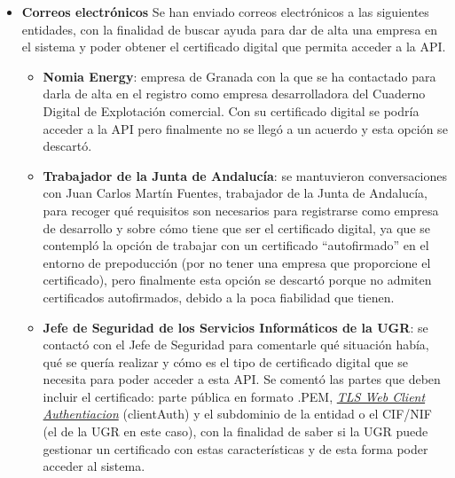\begin{itemize}
\begin{itemize}
        Las soluciones buscadas han conllevado el envío de correos electrónicos a entidades que puedan suplir este problema
        y hacer de ``empresa de desarrollo''. Los correos enviados se van a comentar a continuación.
    \end{itemize}

    \item \textbf{Correos electrónicos}
    \newline
    Se han enviado correos electrónicos a las siguientes entidades, con la finalidad de buscar ayuda para dar de alta
    una empresa en el sistema y poder obtener el certificado digital que permita acceder a la API.

    \begin{itemize}
        \item \textbf{Nomia Energy}: empresa de Granada con la que se ha contactado para darla de alta en el registro
        como empresa desarrolladora del Cuaderno Digital de Explotación comercial. Con su certificado digital se podría
        acceder a la API pero finalmente no se llegó a un acuerdo y esta opción se descartó.

        \item \textbf{Trabajador de la Junta de Andalucía}: se mantuvieron conversaciones con Juan Carlos Martín Fuentes,
        trabajador de la Junta de Andalucía, para recoger qué requisitos son necesarios para registrarse como empresa de 
        desarrollo y sobre cómo tiene que ser el certificado digital, ya que se contempló la opción de trabajar con un 
        certificado ``autofirmado'' en el entorno de prepoducción (por no tener una empresa que proporcione el certificado), 
        pero finalmente esta opción se descartó porque no admiten certificados autofirmados, debido a la poca fiabilidad que
        tienen.        

        \item \textbf{Jefe de Seguridad de los Servicios Informáticos de la UGR}: se contactó con el Jefe de Seguridad
        para comentarle qué situación había, qué se quería realizar y cómo es el tipo de certificado digital que se 
        necesita para poder acceder a esta API. Se comentó las partes que deben incluir el certificado: parte pública 
        en formato .PEM, \hyperlink{certificadoTls}{\textit{TLS Web Client Authentiacion}} (clientAuth) y el 
        subdominio de la entidad o el CIF/NIF (el de la UGR en este caso), con la finalidad de saber si la UGR puede 
        gestionar un certificado con estas características y de esta forma poder acceder al sistema.
    \end{itemize}


\end{itemize}
